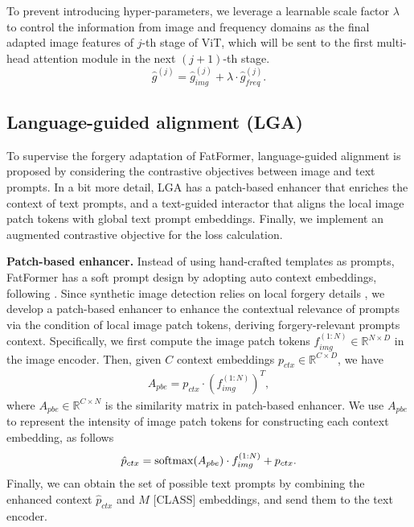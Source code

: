 \documentclass[10pt,twocolumn,letterpaper]{article}
\begin{document}
To prevent introducing hyper-parameters, we leverage a learnable scale factor $\lambda$ to control the information from image and frequency domains as the final adapted image features of $j$-th stage of ViT, which will be sent to the first multi-head attention module in the next $(j+1)$-th stage.
\begin{equation}
    \hat{g}^{(j)} = \hat{g}_{img}^{(j)} + \lambda \cdot \hat{g}_{freq}^{(j)}.
\end{equation}

\subsection{Language-guided alignment (LGA)}
\label{sec:LGA}
To supervise the forgery adaptation of FatFormer, language-guided alignment is proposed by considering the contrastive objectives between image and text prompts. 
In a bit more detail, LGA has a patch-based enhancer that enriches the context of text prompts, and a text-guided interactor that aligns the local image patch tokens with global text prompt embeddings. 
Finally, we implement an augmented contrastive objective for the loss calculation.

\noindent \textbf{Patch-based enhancer.}
Instead of using hand-crafted templates as prompts, FatFormer has a soft prompt design by adopting auto context embeddings, following \cite{zhou2022conditional,zhou2022learning}. 
Since synthetic image detection relies on local forgery details \cite{zhao2021multi,chen2021local}, we develop a patch-based enhancer to enhance the contextual relevance of prompts via the condition of local image patch tokens, deriving forgery-relevant prompts context. Specifically, we first compute the image patch tokens $f_{img}^{(1:N)} \in \mathbb{R}^{N\times D}$ in the image encoder. Then, given $C$ context embeddings $p_{ctx}\in \mathbb{R}^{C\times D}$, we have
\begin{align}
    A_{pbe} = p_{ctx} \cdot (f_{img}^{(1:N)})^T,
\end{align}
where $A_{pbe} \in \mathbb{R}^{C\times N}$ is the similarity matrix in patch-based enhancer. We use $A_{pbe}$ to represent the intensity of image patch tokens for constructing each context embedding, as follows
\begin{align}
    \hat{p}_{ctx} = {\rm softmax}(A_{pbe}) \cdot f_{img}^{(1:N)} + p_{ctx}. \label{eq:ctx}
\end{align}
Finally, we can obtain the set of possible text prompts by combining the enhanced context $\hat{p}_{ctx}$ and $M$ [CLASS] embeddings, and send them to the text encoder.
\end{document}
